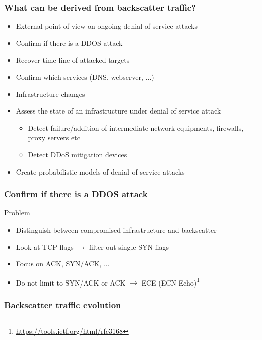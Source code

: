 \documentclass{beamer}
\begin{document}
\begin{frame}
\frametitle{What can be derived from backscatter traffic?}

\begin{itemize}
    \item External point of view on ongoing denial of service attacks
    \item Confirm if there is a DDOS attack
    \item Recover time line of attacked targets
    \item Confirm which services (DNS, webserver, $\dots$)
    \item Infrastructure changes
    \item Assess the state of an infrastructure under denial of service attack
    \begin{itemize}
        \item Detect failure/addition of  intermediate network equipments, firewalls, proxy servers etc
        \item Detect DDoS mitigation devices
    \end{itemize}
    \item Create probabilistic models of denial of service attacks
\end{itemize}
\end{frame}

\begin{frame}
    \frametitle{Confirm if there is a DDOS attack}
    \begin{block}{Problem}
        \begin{itemize}
            \item Distinguish between compromised infrastructure and backscatter
            \item Look at TCP flags $\to$ filter out single SYN flags
            \item Focus on ACK, SYN/ACK, ...
            \item Do not limit to SYN/ACK or ACK $\to$ ECE (ECN Echo)\footnote{\url{https://tools.ietf.org/html/rfc3168}}
        \end{itemize}
    \end{block}
    
\end{frame}

\begin{frame}
    \frametitle{Backscatter traffic evolution}
    \begin{center}
        \scalebox{0.9}{}
    \end{center}
\end{frame}
\end{document}
